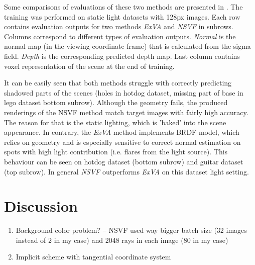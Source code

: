 Some comparisons of evaluations of these two methods are presented in .
The training was performed on static light datasets with 128px images.
Each row contains evaluation outputs for two methods \textit{ExVA} and \textit{NSVF} in subrows.
Columns correspond to different types of evaluation outputs.
\textit{Normal} is the normal map (in the viewing coordinate frame)
that is calculated from the sigma field.
\textit{Depth} is the corresponding predicted depth map.
Last column contains voxel representation of the scene at the end of training.

It can be easily seen that both methods struggle
with correctly predicting shadowed parts of the scenes
(holes in hotdog dataset, missing part of base in lego dataset bottom subrow).
Although the geometry fails, the produced renderings
of the NSVF method match target images with fairly high accuracy.
The reason for that is the static lighting, which is 'baked' into the scene appearance.
In contrary, the \textit{ExVA} method implements BRDF model,
which relies on geometry and is especially sensitive to correct normal estimation
on spots with high light contribution (i.e. flares from the light source).
This behaviour can be seen on hotdog dataset (bottom subrow)
and guitar dataset (top subrow).
In general \textit{NSVF} outperforms \textit{ExVA} on this dataset light setting.


\section{Discussion}

\begin{enumerate}
    \item Background color problem?
    -- NSVF used way bigger batch size (32 images instead of 2 in my case) and 2048 rays in each image (80 in my case)
    \item Implicit scheme with tangential coordinate system
\end{enumerate}





